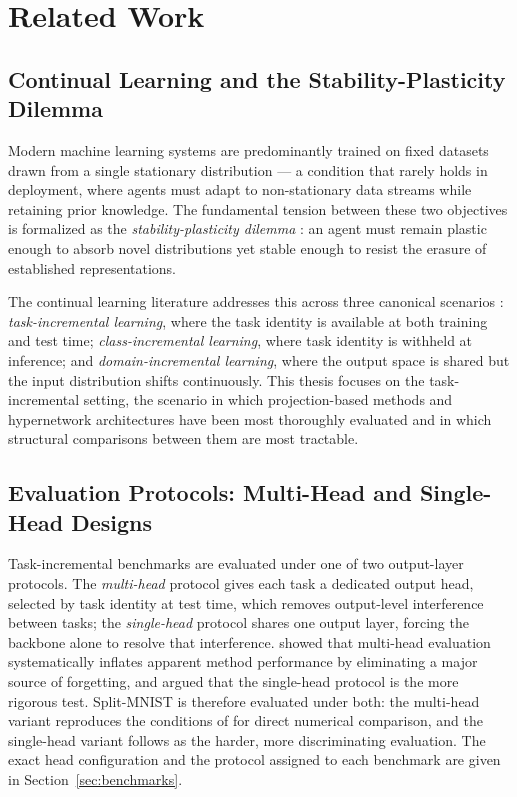 \section{Related Work}
\label{sec:related_work}

\subsection{Continual Learning and the Stability-Plasticity Dilemma}

Modern machine learning systems are predominantly trained on fixed datasets
drawn from a single stationary distribution --- a condition that rarely holds
in deployment, where agents must adapt to non-stationary data streams while
retaining prior knowledge.
The fundamental tension between these two objectives is formalized as the
\emph{stability-plasticity dilemma} \citep{grossberg_how_1980}: an agent must
remain plastic enough to absorb novel distributions yet stable enough to resist
the erasure of established representations.


The continual learning literature addresses this across three canonical
scenarios \citep{de_lange_continual_2022}:
\emph{task-incremental learning}, where the task identity is available at
both training and test time; \emph{class-incremental learning}, where task
identity is withheld at inference; and \emph{domain-incremental learning},
where the output space is shared but the input distribution shifts
continuously.
This thesis focuses on the task-incremental setting, the scenario in which
projection-based methods and hypernetwork architectures have been most
thoroughly evaluated and in which structural comparisons between them are
most tractable.

\subsection{Evaluation Protocols: Multi-Head and Single-Head Designs}
\label{sec:eval_protocols}

Task-incremental benchmarks are evaluated under one of two output-layer
protocols. The \emph{multi-head} protocol gives each task a dedicated output
head, selected by task identity at test time, which removes output-level
interference between tasks; the \emph{single-head} protocol shares one output
layer, forcing the backbone alone to resolve that interference.
\citet{farquhar_towards_2018} showed that multi-head evaluation systematically
inflates apparent method performance by eliminating a major source of
forgetting, and argued that the single-head protocol is the more rigorous
test. Split-MNIST is therefore evaluated under both: the multi-head variant
reproduces the conditions of \citet{garg_fisher-orthogonal_2026} for direct
numerical comparison, and the single-head variant follows
\citet{farquhar_towards_2018} as the harder, more discriminating evaluation.
The exact head configuration and the protocol assigned to each benchmark are
given in Section~\ref{sec:benchmarks}.
